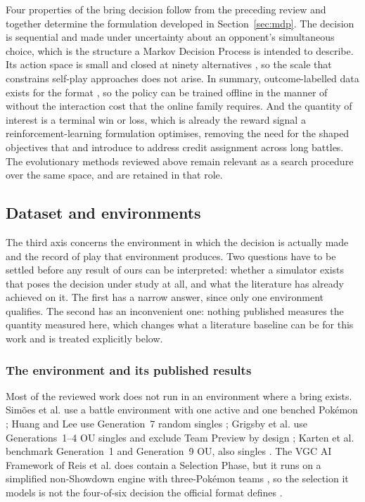 \documentclass[conference]{IEEEtran}
\begin{document}
Four properties of the bring decision follow from the preceding review and
together determine the formulation developed in Section~\ref{sec:mdp}. The
decision is sequential and made under uncertainty about an opponent's
simultaneous choice, which is the structure a Markov Decision Process is
intended to describe. Its action space is small and closed at ninety
alternatives \cite{angliss2026}, so the scale that constrains self-play
approaches does not arise. In summary, outcome-labelled data exists for the format
\cite{angliss2026}, so the policy can be trained offline in the manner of
\cite{grigsby2025} without the interaction cost that the online family
requires. And the quantity of interest is a terminal win or loss, which is
already the reward signal a reinforcement-learning formulation optimises,
removing the need for the shaped objectives that \cite{simoes2020} and
\cite{grigsby2025} introduce to address credit assignment across long battles.
The evolutionary methods reviewed above remain relevant as a search procedure
over the same space, and are retained in that role.
\subsection{Dataset and environments}
\label{sec:axisc}
The third axis concerns the environment in which the decision is actually made
and the record of play that environment produces. Two questions have to be
settled before any result of ours can be interpreted: whether a simulator
exists that poses the decision under study at all, and what the literature has
already achieved on it. The first has a narrow answer, since only one
environment qualifies. The second has an inconvenient one: nothing published
measures the quantity measured here, which changes what a literature baseline
can be for this work and is treated explicitly below.

\subsubsection{The environment and its published results}
Most of the reviewed work does not run in an environment where a bring exists.
Sim\~oes et al. use a battle environment with one active and one benched
Pok\'emon \cite{simoes2020}; Huang and Lee use Generation~7 random singles
\cite{huang2019}; Grigsby et al. use Generations~1--4 OU singles and exclude
Team Preview by design \cite{grigsby2025}; Karten et al. benchmark Generation~1
and Generation~9 OU, also singles \cite{karten2026}. The VGC AI Framework of
Reis et al. does contain a Selection Phase, but it runs on a simplified
non-Showdown engine with three-Pok\'emon teams \cite{reis2021, reis2024,
reis2025}, so the selection it models is not the four-of-six decision the
official format defines \cite{vgchandbook}.
\end{document}
